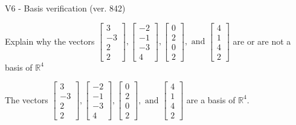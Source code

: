 \begin{exercise}
  \begin{exerciseTitle}V6 - Basis verification (ver. 842)\end{exerciseTitle}
  \begin{exerciseStatement}
    Explain why the vectors \(\left[\begin{array}{r}
3 \\
-3 \\
2 \\
2
\end{array}\right] , \left[\begin{array}{r}
-2 \\
-1 \\
-3 \\
4
\end{array}\right] , \left[\begin{array}{r}
0 \\
2 \\
0 \\
2
\end{array}\right] , \text{ and } \left[\begin{array}{r}
4 \\
1 \\
4 \\
2
\end{array}\right]\) are or are not a basis of \(\mathbb{R}^4\)	


  \end{exerciseStatement}
  \begin{exerciseAnswer}
   The vectors \(\left[\begin{array}{r}
3 \\
-3 \\
2 \\
2
\end{array}\right] , \left[\begin{array}{r}
-2 \\
-1 \\
-3 \\
4
\end{array}\right] , \left[\begin{array}{r}
0 \\
2 \\
0 \\
2
\end{array}\right] , \text{ and } \left[\begin{array}{r}
4 \\
1 \\
4 \\
2
\end{array}\right]\) 
  	 are  a basis of \(\mathbb{R}^4\).
  


  \end{exerciseAnswer}
\end{exercise}